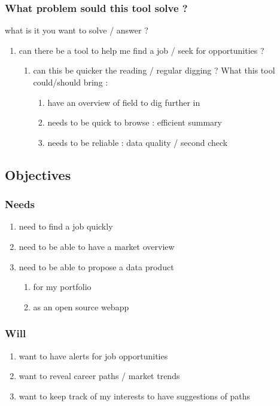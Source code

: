 \documentclass[11pt]{article}
\begin{document}
\subsubsection{What problem sould this tool solve ?}
\label{sec:org209357d}
what is it you want to solve / answer ?
\begin{enumerate}
\item can there be a tool to help me find a job / seek for opportunities ?
\label{sec:org643ba84}
\begin{enumerate}
\item can this be quicker the reading / regular digging ?
\label{sec:org41a90b4}
What this tool could/should  bring :
\begin{enumerate}
\item have an overview of field to dig further in
\label{sec:org6cf9a0a}
\item needs to be quick to browse : efficient summary
\label{sec:orgb00dd9a}
\item needs to be reliable : data quality / second check
\label{sec:org04aa0df}
\end{enumerate}
\end{enumerate}
\end{enumerate}
\subsection{Objectives}
\label{sec:org521e7b3}
\subsubsection{Needs}
\label{sec:orgce21eae}
\begin{enumerate}
\item need to find a job quickly
\label{sec:orgf481347}
\item need to be able to have a market overview
\label{sec:org62b6c56}
\item need to be able to propose a data product
\label{sec:org3763e4c}
\begin{enumerate}
\item for my portfolio
\label{sec:org8a352bd}
\item as an open source webapp
\label{sec:orgf0e3981}
\end{enumerate}
\end{enumerate}
\subsubsection{Will}
\label{sec:org60efc5b}
\begin{enumerate}
\item want to have alerts for job opportunities
\label{sec:orgd59f9e8}
\item want to reveal career paths / market trends
\label{sec:org713dd60}
\item want to keep track of my interests to have suggestions of paths
\label{sec:org1e253b5}
\end{enumerate}
\end{document}
